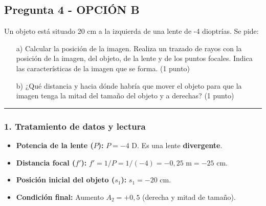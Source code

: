 \newpage

\subsection{Pregunta 4 - OPCIÓN B}
\label{subsec:4B_2025_jun_res}

\begin{cajaenunciado}
Un objeto está situado 20 cm a la izquierda de una lente de -4 dioptrías. Se pide:
\begin{enumerate}
    \item[a)] Calcular la posición de la imagen. Realiza un trazado de rayos con la posición de la imagen, del objeto, de la lente y de los puntos focales. Indica las características de la imagen que se forma. (1 punto)
    \item[b)] ¿Qué distancia y hacia dónde habría que mover el objeto para que la imagen tenga la mitad del tamaño del objeto y a derechas? (1 punto)
\end{enumerate}
\end{cajaenunciado}
\hrule

\subsubsection*{1. Tratamiento de datos y lectura}
\begin{itemize}
    \item \textbf{Potencia de la lente ($P$):} $P = -4$ D. Es una lente \textbf{divergente}.
    \item \textbf{Distancia focal ($f'$):} $f' = 1/P = 1/(-4) = -0,25 \text{ m} = -25$ cm.
    \item \textbf{Posición inicial del objeto ($s_1$):} $s_1 = -20$ cm.
    \item \textbf{Condición final:} Aumento $A_2 = +0,5$ (derecha y mitad de tamaño).
\end{itemize}


